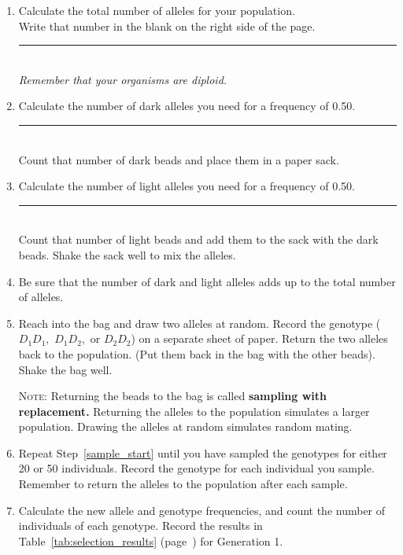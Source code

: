 \documentclass[12pt]{exam}
\newcommand{\allele}[1]{$#1$}
\begin{document}
\begin{enumerate}[resume]
	
	\item \label{total_alleles} Calculate the total number of alleles for your population.\\
	Write that number in the blank on the right side of the page. 
	\hfill \rule{0.5in}{0.4pt}\\ \emph{Remember that your
		organisms are diploid.} 
	
	\item Calculate the number of dark alleles you need for a frequency of 0.50. 
	\hfill \rule{0.5in}{0.4pt} \\ Count that number of dark beads and place 
	them in a paper sack. 
	
	\item Calculate the number of light alleles you need for a frequency of 0.50.
	\hfill \rule{0.5in}{0.4pt} \\ Count that number of light beads and add 
	them to the sack with the dark beads. Shake the sack well to mix the alleles.
	
	\item Be sure that the number of dark and light alleles adds up to the 
	total number of alleles.
	
	
	\item \label{sample_start} Reach into the bag and draw two alleles 
	at random. Record the genotype (\allele{D_1D_1,} \allele{D_1D_2,} or \allele{D_2D_2}) on 
	a separate sheet of paper. Return the two alleles back to the population. 
	(Put them back in the bag with the other beads). Shake the bag well.
	
	\textsc{Note:} Returning the beads to the bag is called \textbf{sampling with replacement.} 
	Returning the alleles to the population simulates a larger population. Drawing 
	the alleles at random simulates random mating.
	
	\item Repeat Step~\ref{sample_start} until you have sampled the genotypes 
	for either 20 or 50 individuals. Record the genotype for each individual you sample. 
	Remember to return the alleles to the population after each sample. 
	
	\item Calculate the new allele and genotype frequencies, and count the number
	of individuals of each genotype. Record the results in Table~\ref{tab:selection_results} (page~\pageref{tab:selection_results}) 
	for Generation 1. 
	
\end{enumerate}
\end{document}
